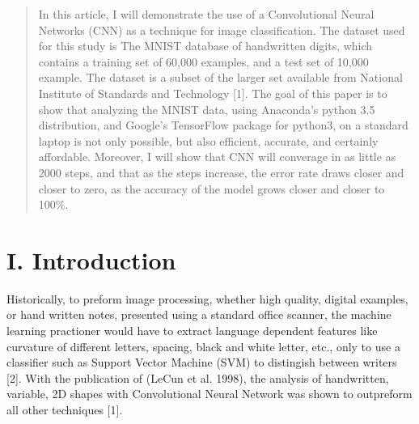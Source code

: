 \documentclass[conference,final,]{IEEEtran}
\begin{document}
\begin{abstract}
In this article, I will demonstrate the use of a Convolutional Neural
Networks (CNN) as a technique for image classification. The dataset used
for this study is The MNIST database of handwritten digits, which
contains a training set of 60,000 examples, and a test set of 10,000
example. The dataset is a subset of the larger set available from
National Institute of Standards and Technology {[}1{]}. The goal of this
paper is to show that analyzing the MNIST data, using Anaconda's python
3.5 distribution, and Google's TensorFlow package for python3, on a
standard laptop is not only possible, but also efficient, accurate, and
certainly affordable. Moreover, I will show that CNN will converage in
as little as 2000 steps, and that as the steps increase, the error rate
draws closer and closer to zero, as the accuracy of the model grows
closer and closer to 100\%.
\end{abstract}





\maketitle


%
\IEEEpeerreviewmaketitle


\section{I. Introduction}\label{i.-introduction}

Historically, to preform image processing, whether high quality, digital
examples, or hand written notes, presented using a standard office
scanner, the machine learning practioner would have to extract language
dependent features like curvature of different letters, spacing, black
and white letter, etc., only to use a classifier such as Support Vector
Machine (SVM) to distingish between writers {[}2{]}. With the
publication of (LeCun et al. 1998), the analysis of handwritten,
variable, 2D shapes with Convolutional Neural Network was shown to
outpreform all other techniques {[}1{]}.
\end{document}
